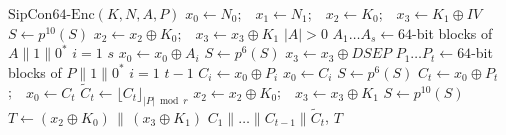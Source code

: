 \begin{algo}{$\mathrm{SipCon64\text{-}Enc}(K, N, A, P)$}\label{alg:enc}
\aln $x_0 \leftarrow N_0$;\ \ $x_1 \leftarrow N_1$;\ \ $x_2 \leftarrow K_0$;\ \ $x_3 \leftarrow K_1 \oplus \mathit{IV}$
\aln $S \leftarrow p^{10}(S)$
\aln $x_2 \leftarrow x_2 \oplus K_0$;\ \ $x_3 \leftarrow x_3 \oplus K_1$
\aln {} $|A| > 0$ 
\aln[1] $A_1 \dots A_s \leftarrow 64$-bit blocks of $A\|1\|0^{*}$
\aln[1]  $i = 1$  $s$ 
\aln[2] $x_0 \leftarrow x_0 \oplus A_i$
\aln[2] $S \leftarrow p^{6}(S)$
\aln[1] 
\aln {}
\aln $x_3 \leftarrow x_3 \oplus \mathit{DSEP}$ 
\aln $P_1 \dots P_t \leftarrow 64$-bit blocks of $P\|1\|0^{*}$
\aln {} $i = 1$  $t-1$ 
\aln[1] $C_i \leftarrow x_0 \oplus P_i$
\aln[1] $x_0 \leftarrow C_i$
\aln[1] $S \leftarrow p^{6}(S)$
\aln {}
\aln $C_t \leftarrow x_0 \oplus P_t$;\ \ $x_0 \leftarrow C_t$ 
\aln $\tilde{C}_t \leftarrow \lfloor C_t \rfloor_{|P| \bmod r}$
\aln $x_2 \leftarrow x_2 \oplus K_0$;\ \ $x_3 \leftarrow x_3 \oplus K_1$
\aln $S \leftarrow p^{10}(S)$
\aln $T \leftarrow (x_2 \oplus K_0) \,\|\, (x_3 \oplus K_1)$
\aunn[1]  $C_1\|\dots\|C_{t-1}\|\tilde{C}_t$, $T$
\end{algo}

